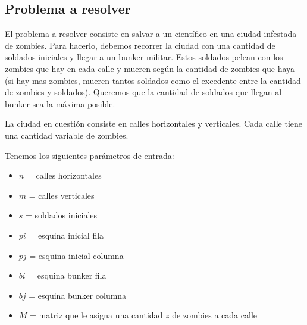 \subsection{Problema a resolver}

El problema a resolver consiste en salvar a un científico en una ciudad infestada de zombies. Para hacerlo, debemos recorrer la ciudad con una cantidad de soldados iniciales y llegar a un bunker militar. Estos soldados pelean con los zombies que hay en cada calle y mueren según la cantidad de zombies que haya (si hay mas zombies, mueren tantos soldados como el excedente entre la cantidad de zombies y soldados). Queremos que la cantidad de soldados que llegan al bunker sea la máxima posible.

La ciudad en cuestión consiste en calles horizontales y verticales. Cada calle tiene una cantidad variable de zombies.

\medskip
Tenemos los siguientes parámetros de entrada:
\begin{multicols}{2}
	\begin{itemize}[noitemsep,nolistsep]
      \item $n$ = calles horizontales
      \item $m$ = calles verticales
      \item $s$ = soldados iniciales
      \item $pi$ = esquina inicial fila
      \item $pj$ = esquina inicial columna
  	\end{itemize}
\columnbreak
	\begin{itemize}[noitemsep,nolistsep]
      \item $bi$ = esquina bunker fila
      \item $bj$ = esquina bunker columna
      \item $M$ = matriz que le asigna una cantidad $z$ de zombies a cada calle
  	\end{itemize}
\end{multicols}
\medskip


